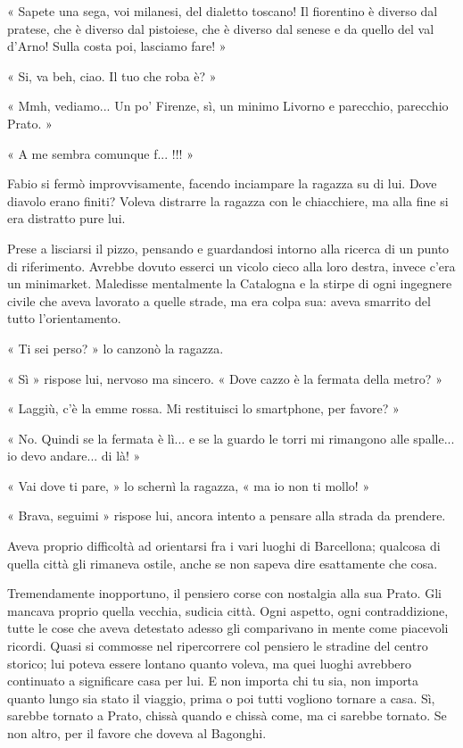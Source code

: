 « Sapete una sega, voi milanesi, del dialetto toscano! Il fiorentino è diverso dal pratese, che è diverso dal pistoiese, che è diverso dal senese e da quello del val d'Arno! Sulla costa poi, lasciamo fare! »

« Si, va beh, ciao. Il tuo che roba è? »

« Mmh, vediamo... Un po' Firenze, sì, un minimo Livorno e parecchio, parecchio Prato. »

« A me sembra comunque f... !!! »

Fabio si fermò improvvisamente, facendo inciampare la ragazza su di lui. Dove diavolo erano finiti? Voleva distrarre la ragazza con le chiacchiere, ma alla fine si era distratto pure lui.

Prese a lisciarsi il pizzo, pensando e guardandosi intorno alla ricerca di un punto di riferimento. Avrebbe dovuto esserci un vicolo cieco alla loro destra, invece c'era un minimarket. Maledisse mentalmente la Catalogna e la stirpe di ogni ingegnere civile che aveva lavorato a quelle strade, ma era colpa sua: aveva smarrito del tutto l'orientamento.

« Ti sei perso? » lo canzonò la ragazza.

« Sì » rispose lui, nervoso ma sincero. « Dove cazzo è la fermata della metro? »

« Laggiù, c'è la emme rossa. Mi restituisci lo smartphone, per favore? »

« No. Quindi se la fermata è lì... e se la guardo le torri mi rimangono alle spalle... io devo andare... di là! »

« Vai dove ti pare, » lo schernì la ragazza, « ma io non ti mollo! »

« Brava, seguimi » rispose lui, ancora intento a pensare alla strada da prendere.

Aveva proprio difficoltà ad orientarsi fra i vari luoghi di Barcellona; qualcosa di quella città gli rimaneva ostile, anche se non sapeva dire esattamente che cosa.

Tremendamente inopportuno, il pensiero corse con nostalgia alla sua Prato. Gli mancava proprio quella vecchia, sudicia città. Ogni aspetto, ogni contraddizione, tutte le cose che aveva detestato adesso gli comparivano in mente come piacevoli ricordi. Quasi si commosse nel ripercorrere col pensiero le stradine del centro storico; lui poteva essere lontano quanto voleva, ma quei luoghi avrebbero continuato a significare casa per lui. E non importa chi tu sia, non importa quanto lungo sia stato il viaggio, prima o poi tutti vogliono tornare a casa. Sì, sarebbe tornato a Prato, chissà quando e chissà come, ma ci sarebbe tornato. Se non altro, per il favore che doveva al Bagonghi.

